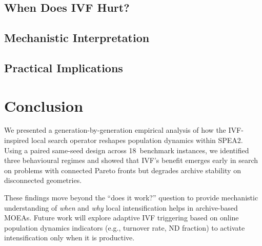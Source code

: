 \documentclass[runningheads]{llncs}
\begin{document}
\subsection{When Does IVF Hurt?}


\subsection{Mechanistic Interpretation}


\subsection{Practical Implications}



\section{Conclusion}
\label{sec:conclusion}

We presented a generation-by-generation empirical analysis of how the
IVF-inspired local search operator reshapes population dynamics within
SPEA2. Using a paired same-seed design across 18~benchmark instances, we
identified three behavioural regimes and showed that IVF's benefit
emerges early in search on problems with connected Pareto fronts but
degrades archive stability on disconnected geometries.

These findings move beyond the ``does it work?'' question to provide
mechanistic understanding of \emph{when} and \emph{why} local
intensification helps in archive-based MOEAs. Future work will explore
adaptive IVF triggering based on online population dynamics indicators
(e.g., turnover rate, ND fraction) to activate intensification only when
it is productive.




\end{document}
